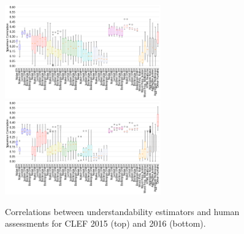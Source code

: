 
\begin{figure}[h!]
   \centering
   \includegraphics[width=0.6\textwidth]{graphics/box_spearman15_raw_values}\vspace{-7pt}
   \includegraphics[width=0.6\textwidth]{graphics/box_spearman16_raw_values}
   \vspace{-0.4cm}
   \caption{Correlations between understandability estimators and human assessments for CLEF 2015 (top) and 2016 (bottom).}
   \label{fig:boxplot_corr_docs}
   \vspace{-10pt}
\end{figure}

%

